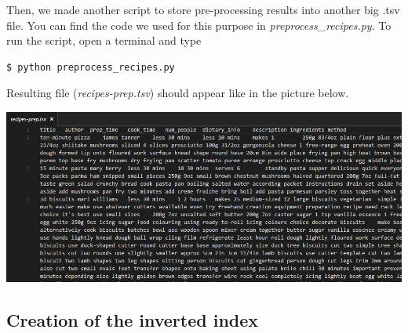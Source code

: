 Then, we made another script to store pre-processing results into another big .tsv file. You can find the code we used for this purpose in \textit{preprocess\_recipes.py}. To run the script, open a terminal and type
\begin{lstlisting}
$ python preprocess_recipes.py
\end{lstlisting}
Resulting file (\textit{recipes-prep.tsv}) should appear like in the picture below.
\begin{center}
	\vspace{5mm}
	\includegraphics[scale=0.5]{img/recipes-prep-tsv.jpg}
\end{center}


\subsection{Creation of the inverted index}

